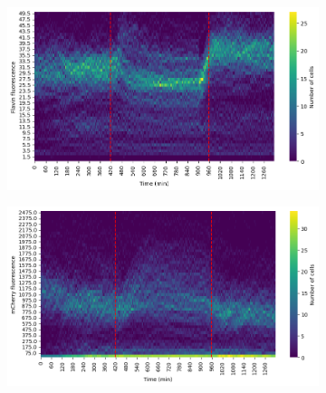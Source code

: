 \begin{figure}[ht!]
  \centering
  \begin{subfigure}[htpb]{0.5\textwidth}
   \centering
   \includegraphics[width=\textwidth]{19972_distribs_flavin.png}
   \caption{
   }
   \label{fig:biology-starvation-histogram-flavin}
  \end{subfigure}%
  \begin{subfigure}[htpb]{0.5\textwidth}
   \centering
   \includegraphics[width=\textwidth]{19972_distribs_mCherry.png}
   \caption{
   }
   \label{fig:biology-starvation-histogram-mCherry}
  \end{subfigure}


\end{figure}
